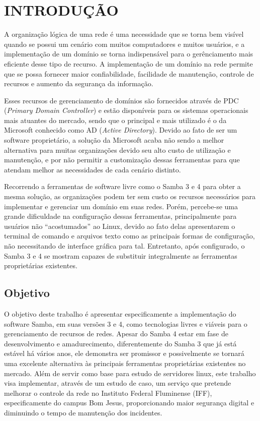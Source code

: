 \chapter{INTRODUÇÃO}

A organização lógica de uma rede é uma necessidade que se torna bem visível quando se possui um cenário com muitos computadores e muitos usuários, e a implementação de um domínio se torna indispensável para o gerênciamento mais eficiente desse tipo de recurso. A implementação de um domínio na rede permite que se possa fornecer maior confiabilidade, facilidade de manutenção, controle de recursos e aumento da segurança da informação.

Esses recursos de gerenciamento de domínios são fornecidos através de PDC (\textit{Primary Domain Controller}) e estão disponíveis para os sistemas operacionais mais atuantes do mercado, sendo que o principal e mais utilizado é o da Microsoft conhecido como AD (\textit{Active Directory}). Devido ao fato de ser um software proprietário, a solução da Microsoft acaba não sendo a melhor alternativa para muitas organizações devido seu alto custo de utilização e manutenção, e por não permitir a customização dessas ferramentas para que atendam melhor as necessidades de cada cenário distinto.

Recorrendo a ferramentas de software livre como o Samba 3 e 4 para obter a mesma solução, as organizações podem ter sem custo os recursos necessários para implementar e gerenciar um domínio em suas redes. Porém, percebe-se uma grande dificuldade na configuração dessas ferramentas, principalmente para usuários não “acostumados” ao Linux, devido ao fato delas apresentarem o terminal de comando e arquivos texto como as principais formas de configuração, não necessitando de interface gráfica para tal. Entretanto, após configurado, o Samba 3 e 4 se mostram capazes de substituir integralmente as ferramentas proprietárias existentes.

\section{Objetivo}

O objetivo deste trabalho é apresentar especificamente a implementação do software Samba, em suas versões 3 e 4, como tecnologias livres e viáveis para o gerenciamento de recursos de redes. Apesar do Samba 4 estar em fase de desenvolvimento e amadurecimento, diferentemente do Samba 3 que já está estável há vários anos, ele demonstra ser promissor e possivelmente se tornará uma excelente alternativa às principais ferramentas proprietárias existentes no mercado. Além de servir como base para estudo de servidores linux, este trabalho visa implementar, através de um estudo de caso, um serviço que pretende melhorar o controle da rede no Instituto Federal Fluminense (IFF), especificamente do campus Bom Jesus, proporcionando maior segurança digital e diminuindo o tempo de manutenção dos incidentes.

